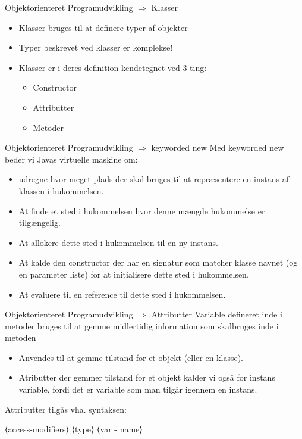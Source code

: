 \documentclass[10pt,aspectratio=1610]{beamer}
\begin{document}
\begin{frame}{Objektorienteret Programudvikling $\Rightarrow$ Klasser}

\begin{itemize}
    \item Klasser bruges til at definere typer af objekter
        \item Typer beskrevet ved klasser er komplekse!
        \item Klasser er i deres definition kendetegnet ved 3 ting:
        \begin{itemize}
            \item Constructor
            \item Attributter
            \item Metoder
        \end{itemize} 
\end{itemize}
\end{frame}

\begin{frame}{Objektorienteret Programudvikling $\Rightarrow$ keyworded new}
Med keyworded \alert{new} beder vi Javas virtuelle maskine om:
\begin{itemize}
    \item udregne hvor meget plads der skal bruges til at repræsentere en instans af klassen i hukommelsen.
    \item At finde et sted i hukommelsen hvor denne mængde hukommelse er tilgængelig.
    \item At allokere dette sted i hukommelsen til en ny instans.
    \item At kalde den constructor der har en signatur som matcher klasse navnet (og en parameter liste) for at initialisere dette sted i hukommelsen.
    \item At evaluere til en reference til dette sted i hukommelsen.
\end{itemize}
\end{frame}

\begin{frame}{Objektorienteret Programudvikling $\Rightarrow$ Attributter}
Variable defineret inde i metoder bruges til at gemme midlertidig information som skalbruges inde i metoden
\begin{itemize}
    \item Anvendes til at gemme tilstand for et objekt (eller en klasse).
    \item Atributter der gemmer tilstand for et objekt kalder vi også for instans variable, fordi det er variable som man tilgår igennem en instans.
\end{itemize}
Attributter tilgås vha. syntaksen: 
\begin{center}
    ⟨access-modifiers⟩ ⟨type⟩  ⟨var - name⟩   
\end{center}
  
\end{frame}
\end{document}
